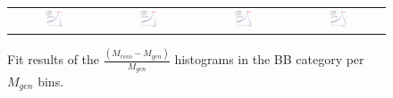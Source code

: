 \begin{figure}[ht]
\begin{center}
\begin{tabular}{cccc}
      \includegraphics[width=0.22\textwidth]{figures/Zprime/2017/mass_resolution/High_Mass/BB_1400_2300}&
      \includegraphics[width=0.22\textwidth]{figures/Zprime/2017/mass_resolution/High_Mass/BB_2300_3500}&
      \includegraphics[width=0.22\textwidth]{figures/Zprime/2017/mass_resolution/High_Mass/BB_3500_4500}&
      \includegraphics[width=0.22\textwidth]{figures/Zprime/2017/mass_resolution/High_Mass/BB_4500_5000}\\
    \end{tabular}
    \caption{Fit results of the $\frac{(M_{reco} - M_{gen})}{M_{gen}}$ histograms in the BB category per $M_{gen}$ bins.
    \label{fig:fit_BB}}
  \end{center}
\end{figure}

